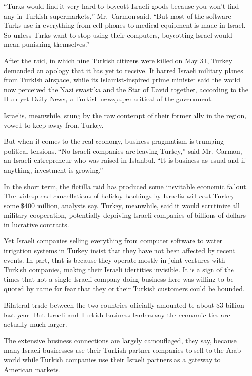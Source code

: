 ﻿\documentclass[12pt]{article}
\begin{document}
``Turks would find it very hard to boycott Israeli goods because you won't find any in Turkish
supermarkets,'' Mr.~Carmon said. ``But most of the software Turks use in everything from cell phones
to medical equipment is made in Israel. So unless Turks want to stop using their computers,
boycotting Israel would mean punishing themselves.''

After the raid, in which nine Turkish citizens were killed on May 31, Turkey demanded an apology
that it has yet to receive. It barred Israeli military planes from Turkish airspace, while its
Islamist-inspired prime minister said the world now perceived the Nazi swastika and the Star of
David together, according to the Hurriyet Daily News, a Turkish newspaper critical of the
government.

Israelis, meanwhile, stung by the raw contempt of their former ally in the region, vowed to keep
away from Turkey.

But when it comes to the real economy, business pragmatism is trumping political tensions. ``No
Israeli companies are leaving Turkey,'' said Mr.~Carmon, an Israeli entrepreneur who was raised in
Istanbul. ``It is business as usual and if anything, investment is growing.''

In the short term, the flotilla raid has produced some inevitable economic fallout. The widespread
cancellations of holiday bookings by Israelis will cost Turkey some \$400 million, analysts say.
Turkey, meanwhile, said it would scrutinize all military cooperation, potentially depriving Israeli
companies of billions of dollars in lucrative contracts.

Yet Israeli companies selling everything from computer software to water irrigation systems in
Turkey insist that they have not been affected by recent events. In part, that is because they
operate mostly in joint ventures with Turkish companies, making their Israeli identities invisible.
It is a sign of the times that not a single Israeli company doing business here was willing to be
quoted by name for fear that they or their Turkish customers could be hounded.

Bilateral trade between the two countries officially amounted to about \$3 billion last year. But
Israeli and Turkish business leaders say the economic ties are actually much larger.

The extensive business connections are largely camouflaged, they say, because many Israeli
businesses use their Turkish partner companies to sell to the Arab world while Turkish companies use
their Israeli partners as a gateway to American markets.
\end{document}
